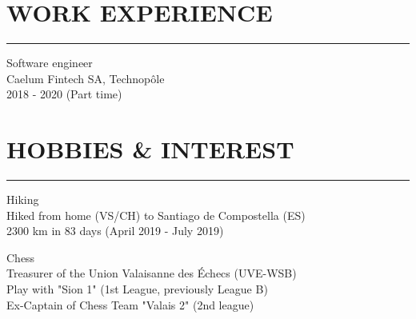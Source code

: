 \documentclass{article}
\let\oldhrule\hrule
\renewcommand{\hrule}{\color{LightGray}\oldhrule\color{black}}
\newcommand{\rubric}[1]{
    \color{MediumGray}

    \section*{\montserratlight \large \MakeUppercase{#1}} 
    \hrule
    \vspace{4mm}
    \raggedright
}
\begin{document}
\begin{minipage}[t]{0.65\textwidth}
  \rubric{Work Experience}

  \color{DeepGray}
  \large Software engineer \\
  \color{MediumGray} \small
  Caelum Fintech SA, Technopôle \\
  2018 - 2020 (Part time)

  \rubric{Hobbies \& Interest}
  \color{DeepGray}
  Hiking \\
  \color{MediumGray} \small
  Hiked from home (VS/CH) to Santiago de Compostella (ES) \\
  2300 km in 83 days (April 2019 - July 2019)

  \color{DeepGray}
  Chess \\
  \color{MediumGray} \small
  Treasurer of the Union Valaisanne des Échecs (UVE-WSB) \\
  Play with "Sion 1" (1st League, previously League B) \\
  Ex-Captain of Chess Team "Valais 2" (2nd league)

\end{minipage}
\end{document}
